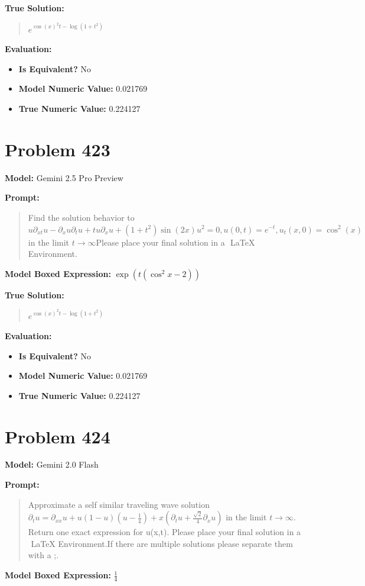 \documentclass{article}
\begin{document}
\textbf{True Solution:}
\begin{quote}
$e^{\cos(x)^2 t - \log(1 + t^2)}$
\end{quote}

\textbf{Evaluation:}
\begin{itemize}
\item \textbf{Is Equivalent?} No
\item \textbf{Model Numeric Value:} 0.021769
\item \textbf{True Numeric Value:} 0.224127
\end{itemize}
\vspace{1cm}
\section*{Problem 423}
\textbf{Model:} Gemini 2.5 Pro Preview

\textbf{Prompt:}
\begin{quote}
Find the solution behavior to$u \partial_{xt} u - \partial_x u \partial_t u + t u \partial_x u + (1 + t^2) \sin(2x) u^2 = 0, u(0, t) = e^{-t}, u_t(x, 0) = \cos^2(x)$ in the limit $t \to \infty$Please place your final solution in a $\boxed{}$ LaTeX Environment.
\end{quote}
\textbf{Model Boxed Expression:} $\exp(t(\cos^2x-2))$

\textbf{True Solution:}
\begin{quote}
$e^{\cos(x)^2 t - \log(1 + t^2)}$
\end{quote}

\textbf{Evaluation:}
\begin{itemize}
\item \textbf{Is Equivalent?} No
\item \textbf{Model Numeric Value:} 0.021769
\item \textbf{True Numeric Value:} 0.224127
\end{itemize}
\vspace{1cm}
\section*{Problem 424}
\textbf{Model:} Gemini 2.0 Flash

\textbf{Prompt:}
\begin{quote}
Approximate a self similar traveling wave solution $ \partial_t u = \partial_{xx} u + u(1-u)(u-\frac{1}{4}) + x \left(\partial_t u + \frac{\sqrt{2}}{4} \partial_x u\right)$ in the limit $t \to \infty$. Return one exact expression for u(x,t). Please place your final solution in a $\boxed{}$ LaTeX Environment.If there are multiple solutions please separate them with a ;.
\end{quote}
\textbf{Model Boxed Expression:} $\frac{1}{4}$
\end{document}
